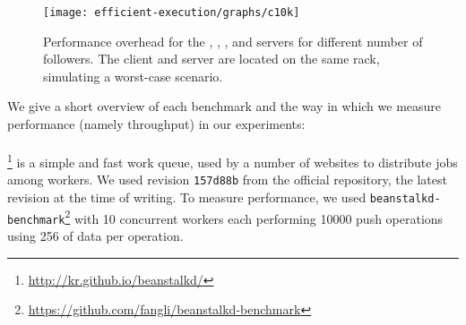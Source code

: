 

\begin{figure}[!t]
 \centering
 \texttt{[image: efficient-execution/graphs/c10k]}
 \caption{Performance overhead for the \beanstalkd, \lighttpd, \memcached, \nginx
   and \redis servers for different number of followers.  The client
   and server are located on the same rack, simulating a worst-case scenario.}
 \label{fig:servers}
\end{figure}

We give a short overview of each benchmark and the way in which we
measure performance (namely throughput) in our experiments:

\paragraph{\beanstalkd}\footnote{\url{http://kr.github.io/beanstalkd/}}
is a simple and fast work queue, used by a number of websites to
distribute jobs among workers. We used revision \lstinline`157d88b` from the
official \git repository, the latest revision at the time of
writing.  To measure performance, we used
\lstinline`beanstalkd-benchmark`\footnote{\url{https://github.com/fangli/beanstalkd-benchmark}}
with \num{10} concurrent workers each performing \num{10000} push operations
using \SI{256}{\byte} of data per operation.


